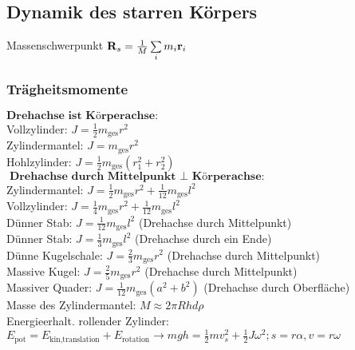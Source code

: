 \documentclass[fs, footer]{latex4ei}
\begin{document}
\begin{multicols*}{4}
\subsection{Dynamik des starren Körpers}
Massenschwerpunkt $\v R_s = \frac{1}{M}\sum_im_i\v r_i$\\ %
\subsubsection{Trägheitsmomente}
$\textbf{Drehachse ist Körperachse:}$\\
Vollzylinder: $J = \frac{1}{2}m_{\text{ges}}r^2$\\
Zylindermantel: $J = m_{\text{ges}}r^2$\\
Hohlzylinder: $J = \frac{1}{2}m_{\text{ges}}(r_1^2+r_2^2)$\\

$\textbf{Drehachse durch Mittelpunkt $\perp$ Körperachse:}$\\
Zylindermantel: $J = \frac{1}{2}m_{\text{ges}}r^2 + \frac{1}{12}m_{\text{ges}}l^2$\\
Vollzylinder: $J = \frac{1}{4}m_{\text{ges}}r^2 + \frac{1}{12}m_{\text{ges}}l^2$\\
Dünner Stab: $J = \frac{1}{12}m_{\text{ges}}l^2$ (Drehachse durch Mittelpunkt)\\
Dünner Stab:  $J = \frac{1}{3}m_{\text{ges}}l^2$ (Drehachse durch ein Ende)\\
Dünne Kugelschale: $J = \frac{2}{3}m_{\text{ges}}r^2$ (Drehachse durch Mittelpunkt)\\
Massive Kugel: $J = \frac{2}{5}m_{\text{ges}}r^2$ (Drehachse durch Mittelpunkt)\\
Massiver Quader: $J = \frac{1}{12}m_{\text{ges}}(a^2+b^2)$ (Drehachse durch Oberfläche)\\


Masse des Zylindermantel: $M \approx 2 \pi R h d \rho$\\
Energieerhalt. rollender Zylinder: $E_{\text{pot}} = E_{\text{kin,translation}} + E_{\text{rotation}} \rightarrow mgh = \frac{1}{2}mv_s^2 + \frac{1}{2}J\omega ^2; s = r\alpha, v = r\omega$\\



\end{multicols*}
\end{document}
